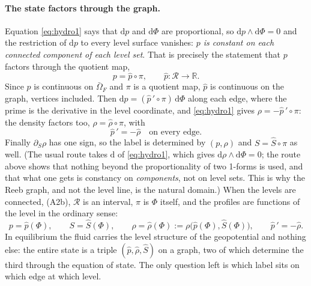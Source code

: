 \documentclass[11pt]{article}
\theoremstyle{definition}
\theoremstyle{remark}
\newcommand{\R}{\mathbb{R}}
\begin{document}
\paragraph{The state factors through the graph.} Equation
\eqref{eq:hydro1} says that $\mathrm dp$ and $\mathrm d\Phi$ are
proportional, so $\mathrm dp\wedge\mathrm d\Phi = 0$ and the
restriction of $\mathrm dp$ to every level surface vanishes: \emph{$p$
is constant on each connected component of each level set}. That is
precisely the statement that $p$ factors through the quotient map,
\begin{equation*}
  p = \hat p\circ\pi,\qquad \hat p: \mathcal R \to \R .
\end{equation*}
Since $p$ is continuous on $\bar\Omega_F$ and $\pi$ is a quotient map,
$\hat p$ is continuous on the graph, vertices included. Then $\mathrm
dp = (\hat p\,'\circ\pi)\,\mathrm d\Phi$ along each edge, where the
prime is the derivative in the level coordinate, and
\eqref{eq:hydro1} gives $\rho = -\hat p\,'\circ\pi$: the density
factors too, $\rho = \hat\rho\circ\pi$, with
\begin{equation}
  \hat p\,' = -\hat\rho \quad\text{on every edge.}
  \label{eq:NL-profile}
\end{equation}
Finally $\partial_S\rho$ has one sign, so the label is determined by
$(p, \rho)$ and $S = \hat S\circ\pi$ as well. (The usual route takes
$\mathrm d$ of \eqref{eq:hydro1}, which gives $\mathrm d\rho\wedge
\mathrm d\Phi = 0$; the route above shows that nothing beyond the
proportionality of two 1-forms is used, and that what one gets is
constancy on \emph{components}, not on level sets. This is why the
Reeb graph, and not the level line, is the natural domain.) When the
levels are connected, (A2b), $\mathcal R$ is an interval, $\pi$ is
$\Phi$ itself, and the profiles are functions of the level in the
ordinary sense:
\begin{equation}
  p = \hat p(\Phi),\qquad S = \hat S(\Phi),\qquad
  \rho = \hat\rho(\Phi) := \rho\bigl(\hat p(\Phi), \hat S(\Phi)\bigr),
  \qquad \hat p\,' = -\hat\rho .
  \label{eq:profiles}
\end{equation}
In equilibrium the fluid carries the level structure of the
geopotential and nothing else: the entire state is a triple $(\hat p,
\hat\rho, \hat S)$ on a graph, two of which determine the third through
the equation of state. The only question left is which label sits on
which edge at which level.
\end{document}
